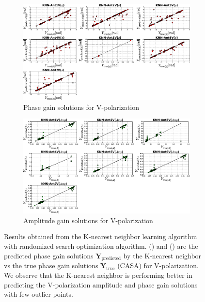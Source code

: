 \begin{figure}[H]
   \centering
    \begin{subfigure}[t]{0.52\textheight}
        
        \includegraphics[width=\textwidth]{images/KNNVphase.eps} 
        \caption{Phase gain solutions for V-polarization} \label{A5}
    \end{subfigure}
    
      \begin{subfigure}[t]{0.52\textheight}
       
        \includegraphics[width=\textwidth]{images/KNNVamp.eps} 
        \caption{Amplitude gain solutions for V-polarization} \label{B5}
    \end{subfigure}
    \caption{Results obtained from the K-nearest neighbor learning algorithm with randomized search optimization algorithm. () and () are the predicted phase gain solutions $\textbf{Y}_\mathrm{predicted}$ by the K-nearest neighbor vs the true phase gain solutions $\textbf{Y}_\mathrm{true}$ (CASA) for V-polarization. We observe that the K-nearest neighbor is performing better in predicting the V-polarization amplitude and phase gain solutions with few outlier points. }
    \label{BBB4}
    \end{figure} 
   

